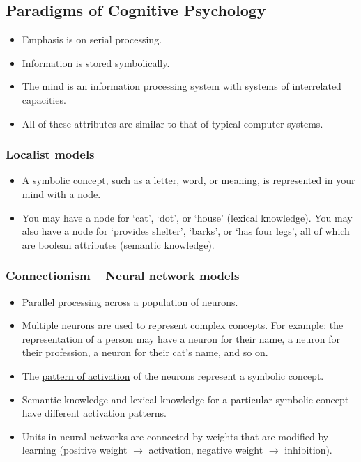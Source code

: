 \documentclass[]{article}
\begin{document}
		\subsection{Paradigms of Cognitive Psychology}
			\begin{itemize}
				\item Emphasis is on serial processing.
				\item Information is stored symbolically.
				\item The mind is an information processing system with systems of interrelated capacities.
				\item All of these attributes are similar to that of typical computer systems.
			\end{itemize}

			\subsubsection{Localist models}
				\begin{itemize}
					\item A symbolic concept, such as a letter, word, or meaning, is represented in your mind with a node.
					\item You may have a node for `cat', `dot', or `house' (lexical knowledge). You may also have a node for `provides shelter', `barks', or `has four legs', all of which are boolean attributes (semantic knowledge).
				\end{itemize}

			\subsubsection{Connectionism -- Neural network models}
				\begin{itemize}
					\item Parallel processing across a population of neurons.
					\item Multiple neurons are used to represent complex concepts. For example: the representation of a person may have a neuron for their name, a neuron for their profession, a neuron for their cat's name, and so on.
					\item The \underline{pattern of activation} of the neurons represent a symbolic concept.
					\item Semantic knowledge and lexical knowledge for a particular symbolic concept have different activation patterns.
					\item Units in neural networks are connected by weights that are modified by learning (positive weight $\to$ activation, negative weight $\to$ inhibition).
				\end{itemize}
\end{document}
